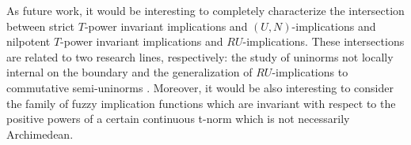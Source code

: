 As future work, it would be interesting to completely characterize the intersection between strict $T$-power invariant implications and $(U,N)$-implications and  nilpotent $T$-power invariant implications and $RU$-implications. These intersections are related to two research lines, respectively: the study of uninorms not locally internal on the boundary \cite{Li2018,Xie2022} and the generalization of $RU$-implications to commutative semi-uninorms \cite{Krol2011,Ouyang2012}.  Moreover, it would be also interesting to consider the family of fuzzy implication functions which are invariant with respect to the positive powers of a certain continuous t-norm which is not necessarily Archimedean. 
